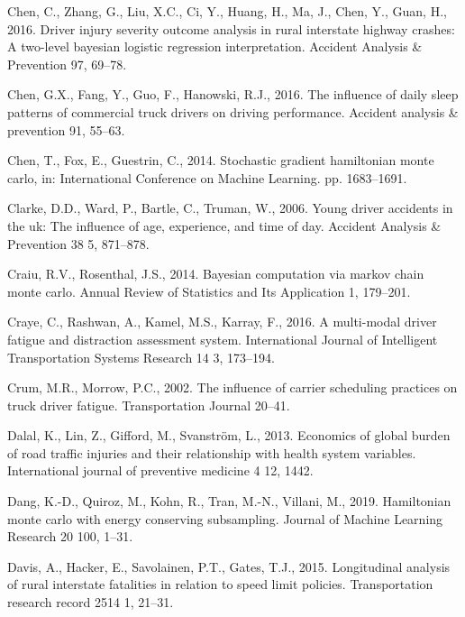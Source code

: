 \documentclass[12pt]{book}
\numberwithin{equation}{chapter}
\begin{document}
\leavevmode\hypertarget{ref-chen2016driver}{}%
Chen, C., Zhang, G., Liu, X.C., Ci, Y., Huang, H., Ma, J., Chen, Y., Guan, H., 2016. Driver injury severity outcome analysis in rural interstate highway crashes: A two-level bayesian logistic regression interpretation. Accident Analysis \& Prevention 97, 69--78.

\leavevmode\hypertarget{ref-chen2016influence}{}%
Chen, G.X., Fang, Y., Guo, F., Hanowski, R.J., 2016. The influence of daily sleep patterns of commercial truck drivers on driving performance. Accident analysis \& prevention 91, 55--63.

\leavevmode\hypertarget{ref-chen2014stochastic}{}%
Chen, T., Fox, E., Guestrin, C., 2014. Stochastic gradient hamiltonian monte carlo, in: International Conference on Machine Learning. pp. 1683--1691.

\leavevmode\hypertarget{ref-clarke2006young}{}%
Clarke, D.D., Ward, P., Bartle, C., Truman, W., 2006. Young driver accidents in the uk: The influence of age, experience, and time of day. Accident Analysis \& Prevention 38 5, 871--878.

\leavevmode\hypertarget{ref-craiu2014bayesian}{}%
Craiu, R.V., Rosenthal, J.S., 2014. Bayesian computation via markov chain monte carlo. Annual Review of Statistics and Its Application 1, 179--201.

\leavevmode\hypertarget{ref-craye2016multi}{}%
Craye, C., Rashwan, A., Kamel, M.S., Karray, F., 2016. A multi-modal driver fatigue and distraction assessment system. International Journal of Intelligent Transportation Systems Research 14 3, 173--194.

\leavevmode\hypertarget{ref-crum2002influence}{}%
Crum, M.R., Morrow, P.C., 2002. The influence of carrier scheduling practices on truck driver fatigue. Transportation Journal 20--41.

\leavevmode\hypertarget{ref-dalal2013economics}{}%
Dalal, K., Lin, Z., Gifford, M., Svanström, L., 2013. Economics of global burden of road traffic injuries and their relationship with health system variables. International journal of preventive medicine 4 12, 1442.

\leavevmode\hypertarget{ref-dang2019hamiltonian}{}%
Dang, K.-D., Quiroz, M., Kohn, R., Tran, M.-N., Villani, M., 2019. Hamiltonian monte carlo with energy conserving subsampling. Journal of Machine Learning Research 20 100, 1--31.

\leavevmode\hypertarget{ref-davis2015longitudinal}{}%
Davis, A., Hacker, E., Savolainen, P.T., Gates, T.J., 2015. Longitudinal analysis of rural interstate fatalities in relation to speed limit policies. Transportation research record 2514 1, 21--31.
\end{document}
